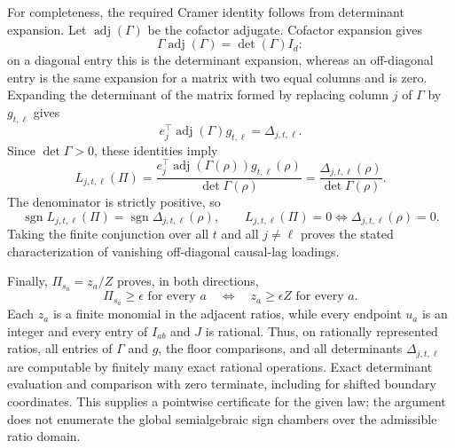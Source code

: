 For completeness, the required Cramer identity follows from determinant expansion.  Let \(\operatorname{adj}(\Gamma)\) be the cofactor adjugate.  Cofactor expansion gives
\[
 \Gamma\operatorname{adj}(\Gamma)=\det(\Gamma)I_d:
\]
on a diagonal entry this is the determinant expansion, whereas an off-diagonal entry is the same expansion for a matrix with two equal columns and is zero.  Expanding the determinant of the matrix formed by replacing column \(j\) of \(\Gamma\) by \(g_{t,\ell}\) gives
\[
 e_j^{\top}\operatorname{adj}(\Gamma)g_{t,\ell}
 =\Delta_{j,t,\ell}.
\]
Since \(\det\Gamma>0\), these identities imply
\[
 L_{j,t,\ell}(\Pi)
 =\frac{e_j^{\top}\operatorname{adj}(\Gamma(\rho))g_{t,\ell}(\rho)}
        {\det\Gamma(\rho)}
 =\frac{\Delta_{j,t,\ell}(\rho)}{\det\Gamma(\rho)}.
\]
The denominator is strictly positive, so
\[
 \operatorname{sgn}L_{j,t,\ell}(\Pi)
 =\operatorname{sgn}\Delta_{j,t,\ell}(\rho),
 \qquad
 L_{j,t,\ell}(\Pi)=0
 \Longleftrightarrow
 \Delta_{j,t,\ell}(\rho)=0.
\]
Taking the finite conjunction over all \(t\) and all \(j\neq\ell\) proves the stated characterization of vanishing off-diagonal causal-lag loadings.

Finally, \(\Pi_{s_a}=z_a/Z\) proves, in both directions,
\[
 \Pi_{s_a}\geq\epsilon\text{ for every }a
 \quad\Longleftrightarrow\quad
 z_a\geq\epsilon Z\text{ for every }a.
\]
Each \(z_a\) is a finite monomial in the adjacent ratios, while every endpoint \(u_a\) is an integer and every entry of \(I_{ab}\) and \(J\) is rational.  Thus, on rationally represented ratios, all entries of \(\Gamma\) and \(g\), the floor comparisons, and all determinants \(\Delta_{j,t,\ell}\) are computable by finitely many exact rational operations.  Exact determinant evaluation and comparison with zero terminate, including for shifted boundary coordinates.  This supplies a pointwise certificate for the given law; the argument does not enumerate the global semialgebraic sign chambers over the admissible ratio domain.
